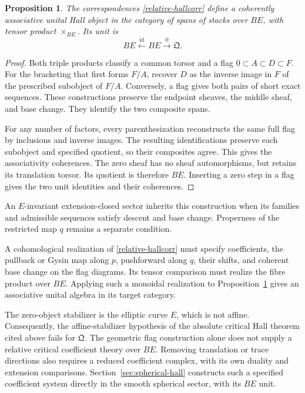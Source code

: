 \documentclass[11pt]{article}
\newtheorem{proposition}[theorem]{Proposition}
\begin{document}
\begin{proposition}\label{relative-hall-flags}
The correspondences \eqref{relative-hallcorr} define a coherently
associative unital Hall object in the category of spans of stacks over
$BE$, with tensor product $\times_{BE}$.
Its unit is
\[
 BE\xleftarrow{\operatorname{id}}BE
       \xrightarrow{0}\mathfrak Q.
\]
\end{proposition}
\begin{proof}
Both triple products classify a common torsor and a flag
$0\subset A\subset D\subset F$.
For the bracketing that first forms $F/A$, recover $D$ as the inverse
image in $F$ of the prescribed subobject of $F/A$.
Conversely, a flag gives both pairs of short exact sequences.
These constructions preserve the endpoint sheaves, the middle sheaf,
and base change. They identify the two composite spans.

For any number of factors, every parenthesization reconstructs the
same full flag by inclusions and inverse images.
The resulting identifications preserve each subobject and specified
quotient, so their composites agree.
This gives the associativity coherences.
The zero sheaf has no sheaf automorphisms, but retains its translation
torsor. Its quotient is therefore $BE$.
Inserting a zero step in a flag gives the two unit identities and their
coherences.
\end{proof}

An $E$-invariant extension-closed sector inherits this construction
when its families and admissible sequences satisfy descent and base
change. Properness of the restricted map $q$ remains a separate
condition.

A cohomological realization of \eqref{relative-hallcorr} must specify
coefficients, the pullback or Gysin map along $p$, pushforward along $q$,
their shifts, and coherent base change on the flag diagrams.
Its tensor comparison must realize the fibre product over $BE$.
Applying such a monoidal realization to
Proposition~\ref{relative-hall-flags} gives an associative unital algebra
in its target category.

The zero-object stabilizer is the elliptic curve $E$, which is not
affine. Consequently, the affine-stabilizer hypothesis of the absolute
critical Hall theorem cited above fails for $\mathfrak Q$.
The geometric flag construction alone does not supply a relative critical
coefficient theory over $BE$.
Removing translation or trace directions also requires a reduced
coefficient complex, with its own duality and extension comparisons.
Section~\ref{sec:spherical-hall} constructs such a specified coefficient
system directly in the smooth spherical sector, with its $BE$ unit.
\end{document}
